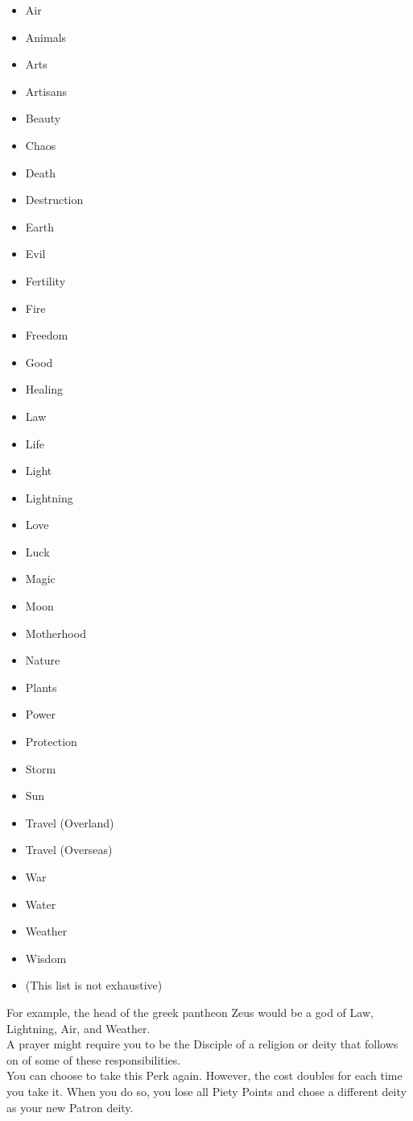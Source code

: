 \begin{itemize}
    \item Air
    \item Animals
    \item Arts
    \item Artisans
    \item Beauty
    \item Chaos
    \item Death
    \item Destruction
    \item Earth
    \item Evil
    \item Fertility
    \item Fire
    \item Freedom
    \item Good
    \item Healing
    \item Law
    \item Life
    \item Light
    \item Lightning
    \item Love
    \item Luck
    \item Magic
    \item Moon
    \item Motherhood
    \item Nature
    \item Plants
    \item Power
    \item Protection
    \item Storm
    \item Sun
    \item Travel (Overland)
    \item Travel (Overseas)
    \item War
    \item Water
    \item Weather
    \item Wisdom
    \item (This list is not exhaustive)
\end{itemize}
For example, the head of the greek pantheon Zeus would be a god of Law, Lightning, Air, and Weather.\\
A prayer might require you to be the Disciple of a religion or deity that follows on of some of these responsibilities.
\\
You can choose to take this Perk again.
However, the cost doubles for each time you take it.
When you do so, you lose all Piety Points and chose a different deity as your new Patron deity.